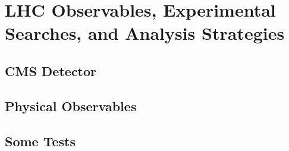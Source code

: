 \chapter{LHC Observables, Experimental Searches, and Analysis Strategies}

\section{CMS Detector}

\section{Physical Observables}

\section{Some Tests}